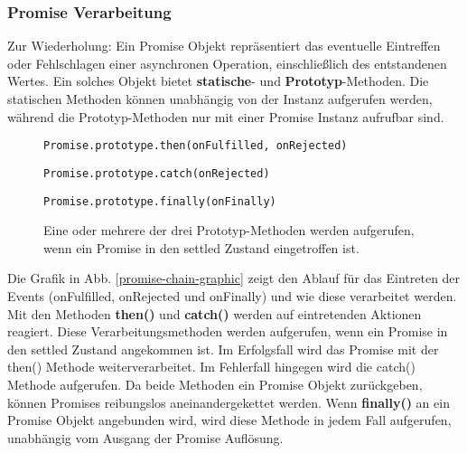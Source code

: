 \subsubsection{Promise Verarbeitung}

Zur Wiederholung: Ein Promise Objekt repräsentiert das eventuelle Eintreffen oder Fehlschlagen einer asynchronen Operation, einschließlich des entstandenen Wertes. Ein solches Objekt bietet \textbf{statische}- und \textbf{Prototyp}-Methoden. Die statischen Methoden können unabhängig von der Instanz aufgerufen werden, während die Prototyp-Methoden nur mit einer Promise Instanz aufrufbar sind.

\begin{description}

\begin{figure}[H]
\item \begin{lstlisting}[basicstyle=\small]
Promise.prototype.then(onFulfilled, onRejected)
\end{lstlisting}

\item \begin{lstlisting}[basicstyle=\small]
Promise.prototype.catch(onRejected)
\end{lstlisting}


\item \begin{lstlisting}[basicstyle=\small]
Promise.prototype.finally(onFinally)
\end{lstlisting}
\caption{Eine oder mehrere der drei Prototyp-Methoden werden aufgerufen, wenn ein Promise in den settled Zustand eingetroffen ist.}
\end{figure}

\end{description}

\noindent
Die Grafik in Abb. \ref{promise-chain-graphic} zeigt den Ablauf für das Eintreten der Events (onFulfilled, onRejected und onFinally) und wie diese verarbeitet werden. Mit den Methoden \textbf{then()} und \textbf{catch()} werden auf eintretenden Aktionen reagiert. Diese Verarbeitungsmethoden werden aufgerufen, wenn ein Promise in den settled Zustand angekommen ist. Im Erfolgsfall wird das Promise mit der then() Methode weiterverarbeitet. Im Fehlerfall hingegen wird die catch() Methode aufgerufen. Da beide Methoden ein Promise Objekt zurückgeben, können Promises reibungslos aneinandergekettet werden. Wenn \textbf{finally()} an ein Promise Objekt angebunden wird, wird diese Methode in jedem Fall aufgerufen, unabhängig vom Ausgang der Promise Auflösung.

